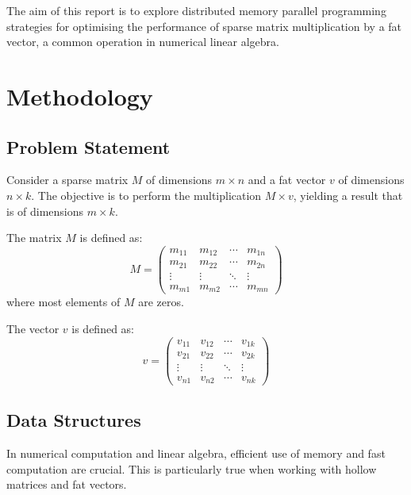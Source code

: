 \documentclass[12pt,oneside]{book} %
\begin{document}
The aim of this report is to explore distributed memory parallel programming
strategies for optimising the performance of sparse matrix multiplication by a
fat vector, a common operation in numerical linear algebra.

\chapter{Methodology}

\section{Problem Statement}
Consider a sparse matrix $M$ of dimensions $m \times n$ and a fat vector $v$ of
dimensions $n \times k$. The objective is to perform the multiplication $M
    \times v$, yielding a result that is of dimensions $m \times k$.

The matrix $M$ is defined as:
\begin{equation}
    M = \begin{pmatrix}
        m_{11} & m_{12} & \cdots & m_{1n} \\
        m_{21} & m_{22} & \cdots & m_{2n} \\
        \vdots & \vdots & \ddots & \vdots \\
        m_{m1} & m_{m2} & \cdots & m_{mn}
    \end{pmatrix}
\end{equation}\label{eq:sparse-matrix}
where most elements of $M$ are zeros.

The vector $v$ is defined as:
\begin{equation}
    v = \begin{pmatrix}
        v_{11} & v_{12} & \cdots & v_{1k} \\
        v_{21} & v_{22} & \cdots & v_{2k} \\
        \vdots & \vdots & \ddots & \vdots \\
        v_{n1} & v_{n2} & \cdots & v_{nk}
    \end{pmatrix}\label{eq:fat-vector}
\end{equation}

\newpage
\section{Data Structures}
In numerical computation and linear algebra, efficient use of memory and fast
computation are crucial. This is particularly true when working with hollow
matrices and fat vectors.
\end{document}

